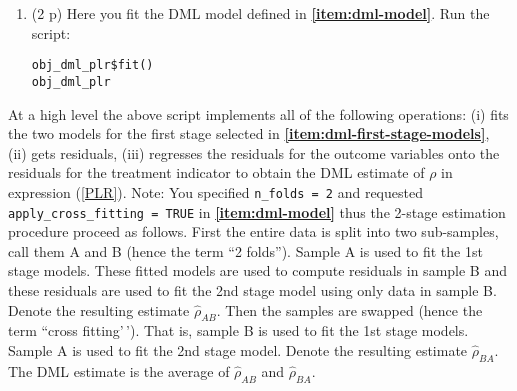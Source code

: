 \documentclass[
]{article}
\newenvironment{Shaded}{\begin{snugshade}}{\end{snugshade}}
\newcommand{\AttributeTok}[1]{\textcolor[rgb]{0.13,0.29,0.53}{#1}}
\newcommand{\ConstantTok}[1]{\textcolor[rgb]{0.56,0.35,0.01}{#1}}
\newcommand{\DecValTok}[1]{\textcolor[rgb]{0.00,0.00,0.81}{#1}}
\newcommand{\FunctionTok}[1]{\textcolor[rgb]{0.13,0.29,0.53}{\textbf{#1}}}
\newcommand{\NormalTok}[1]{#1}
\newcommand{\OtherTok}[1]{\textcolor[rgb]{0.56,0.35,0.01}{#1}}
\newcommand{\SpecialCharTok}[1]{\textcolor[rgb]{0.81,0.36,0.00}{\textbf{#1}}}
\newcommand{\StringTok}[1]{\textcolor[rgb]{0.31,0.60,0.02}{#1}}
\begin{document}
\begin{enumerate}
\begin{Shaded}
\end{Shaded}

  \begin{enumerate}
  \def\labelenumii{\alph{enumii}.}
  \setcounter{enumii}{7}
  \item
    (2 p) Here you fit the DML model defined in
    \textbf{\ref{item:dml-model}}. Run the script:

\begin{verbatim}
obj_dml_plr$fit()
obj_dml_plr
\end{verbatim}
  \end{enumerate}

  At a high level the above script implements all of the following
  operations: (i) fits the two models for the first stage selected in
  \textbf{\ref{item:dml-first-stage-models}}, (ii) gets residuals, (iii)
  regresses the residuals for the outcome variables onto the residuals
  for the treatment indicator to obtain the DML estimate of \(\rho\) in
  expression (\ref{PLR}). Note: You specified \texttt{n\_folds = 2} and
  requested \texttt{apply\_cross\_fitting = TRUE} in
  \textbf{\ref{item:dml-model}} thus the 2-stage estimation procedure
  proceed as follows. First the entire data is split into two
  sub-samples, call them A and B (hence the term ``2 folds''). Sample A
  is used to fit the 1st stage models. These fitted models are used to
  compute residuals in sample B and these residuals are used to fit the
  2nd stage model using only data in sample B. Denote the resulting
  estimate \(\hat{\rho}_{AB}\). Then the samples are swapped (hence the
  term ``cross fitting'\,'). That is, sample B is used to fit the 1st
  stage models. Sample A is used to fit the 2nd stage model. Denote the
  resulting estimate \(\hat{\rho}_{BA}\). The DML estimate is the
  average of \(\hat{\rho}_{AB}\) and \(\hat{\rho}_{BA}\).


\end{enumerate}
\end{document}
